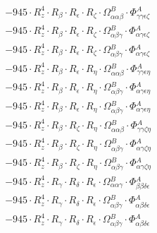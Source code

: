 \documentclass{article}
\begin{document}
\begin{subequations}
\begin{gather}
\begin{array}{c}
 \\[0.2em] 		 - 945 \cdot R_{z}^{4} \cdot R_{\beta{}} \cdot R_{\epsilon{}} \cdot R_{\zeta{}} \cdot \Omega{}^{B}_{\alpha{}\alpha{}\beta{}} \cdot \Phi{}^{A}_{\gamma{}\gamma{}\epsilon{}\zeta{}} 
 \\[0.2em] 		 - 945 \cdot R_{z}^{4} \cdot R_{\beta{}} \cdot R_{\epsilon{}} \cdot R_{\zeta{}} \cdot \Omega{}^{B}_{\alpha{}\beta{}\gamma{}} \cdot \Phi{}^{A}_{\alpha{}\gamma{}\epsilon{}\zeta{}} 
 \\[0.2em] 		 - 945 \cdot R_{z}^{4} \cdot R_{\beta{}} \cdot R_{\epsilon{}} \cdot R_{\zeta{}} \cdot \Omega{}^{B}_{\alpha{}\beta{}\gamma{}} \cdot \Phi{}^{A}_{\alpha{}\gamma{}\epsilon{}\zeta{}} 
 \\[0.2em] 		 - 945 \cdot R_{z}^{4} \cdot R_{\beta{}} \cdot R_{\epsilon{}} \cdot R_{\eta{}} \cdot \Omega{}^{B}_{\alpha{}\alpha{}\beta{}} \cdot \Phi{}^{A}_{\gamma{}\gamma{}\epsilon{}\eta{}} 
 \\[0.2em] 		 - 945 \cdot R_{z}^{4} \cdot R_{\beta{}} \cdot R_{\epsilon{}} \cdot R_{\eta{}} \cdot \Omega{}^{B}_{\alpha{}\beta{}\gamma{}} \cdot \Phi{}^{A}_{\alpha{}\gamma{}\epsilon{}\eta{}} 
 \\[0.2em] 		 - 945 \cdot R_{z}^{4} \cdot R_{\beta{}} \cdot R_{\epsilon{}} \cdot R_{\eta{}} \cdot \Omega{}^{B}_{\alpha{}\beta{}\gamma{}} \cdot \Phi{}^{A}_{\alpha{}\gamma{}\epsilon{}\eta{}} 
 \\[0.2em] 		 - 945 \cdot R_{z}^{4} \cdot R_{\beta{}} \cdot R_{\zeta{}} \cdot R_{\eta{}} \cdot \Omega{}^{B}_{\alpha{}\alpha{}\beta{}} \cdot \Phi{}^{A}_{\gamma{}\gamma{}\zeta{}\eta{}} 
 \\[0.2em] 		 - 945 \cdot R_{z}^{4} \cdot R_{\beta{}} \cdot R_{\zeta{}} \cdot R_{\eta{}} \cdot \Omega{}^{B}_{\alpha{}\beta{}\gamma{}} \cdot \Phi{}^{A}_{\alpha{}\gamma{}\zeta{}\eta{}} 
 \\[0.2em] 		 - 945 \cdot R_{z}^{4} \cdot R_{\beta{}} \cdot R_{\zeta{}} \cdot R_{\eta{}} \cdot \Omega{}^{B}_{\alpha{}\beta{}\gamma{}} \cdot \Phi{}^{A}_{\alpha{}\gamma{}\zeta{}\eta{}} 
 \\[0.2em] 		 - 945 \cdot R_{z}^{4} \cdot R_{\gamma{}} \cdot R_{\delta{}} \cdot R_{\epsilon{}} \cdot \Omega{}^{B}_{\alpha{}\alpha{}\gamma{}} \cdot \Phi{}^{A}_{\beta{}\beta{}\delta{}\epsilon{}} 
 \\[0.2em] 		 - 945 \cdot R_{z}^{4} \cdot R_{\gamma{}} \cdot R_{\delta{}} \cdot R_{\epsilon{}} \cdot \Omega{}^{B}_{\alpha{}\beta{}\gamma{}} \cdot \Phi{}^{A}_{\alpha{}\beta{}\delta{}\epsilon{}} 
 \\[0.2em] 		 - 945 \cdot R_{z}^{4} \cdot R_{\gamma{}} \cdot R_{\delta{}} \cdot R_{\epsilon{}} \cdot \Omega{}^{B}_{\alpha{}\beta{}\gamma{}} \cdot \Phi{}^{A}_{\alpha{}\beta{}\delta{}\epsilon{}} 

\end{array}
\end{gather}
\end{subequations}
\end{document}
